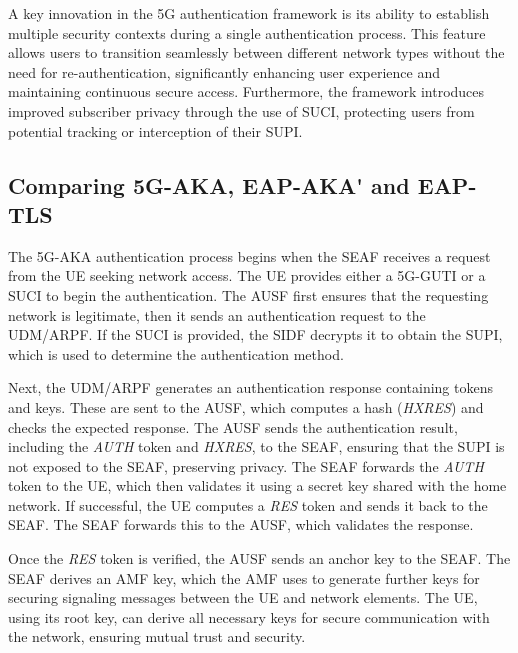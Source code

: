 A key innovation in the \ac{5G} authentication framework is its ability to establish multiple security contexts during a single authentication process. This feature allows users to transition seamlessly between different network types without the need for re-authentication, significantly enhancing user experience and maintaining continuous secure access. Furthermore, the framework introduces improved subscriber privacy through the use of \ac{SUCI}, protecting users from potential tracking or interception of their \ac{SUPI}.%

\subsection{Comparing \ac{5G-AKA}, \ac{EAP-AKA'} and \ac{EAP-TLS}}

The \ac{5G-AKA} authentication process begins when the \ac{SEAF} receives a request from the \ac{UE} seeking network access. The \ac{UE} provides either a \ac{5G-GUTI} or a \ac{SUCI} to begin the authentication. The \ac{AUSF} first ensures that the requesting network is legitimate, then it sends an authentication request to the \ac{UDM}/\ac{ARPF}. If the \ac{SUCI} is provided, the \ac{SIDF} decrypts it to obtain the \ac{SUPI}, which is used to determine the authentication method.%


Next, the \ac{UDM}/\ac{ARPF} generates an authentication response containing tokens and keys. These are sent to the \ac{AUSF}, which computes a hash (\textit{HXRES}) and checks the expected response. The \ac{AUSF} sends the authentication result, including the \textit{AUTH} token and \textit{HXRES}, to the \ac{SEAF}, ensuring that the \ac{SUPI} is not exposed to the \ac{SEAF}, preserving privacy. The \ac{SEAF} forwards the \textit{AUTH} token to the \ac{UE}, which then validates it using a secret key shared with the home network. If successful, the \ac{UE} computes a \textit{RES} token and sends it back to the \ac{SEAF}. The \ac{SEAF} forwards this to the \ac{AUSF}, which validates the response.

Once the \textit{RES} token is verified, the \ac{AUSF} sends an anchor key to the \ac{SEAF}. The \ac{SEAF} derives an \acs{AMF} key, which the \acl{AMF} uses to generate further keys for securing signaling messages between the \ac{UE} and network elements. The \ac{UE}, using its root key, can derive all necessary keys for secure communication with the network, ensuring mutual trust and security.

